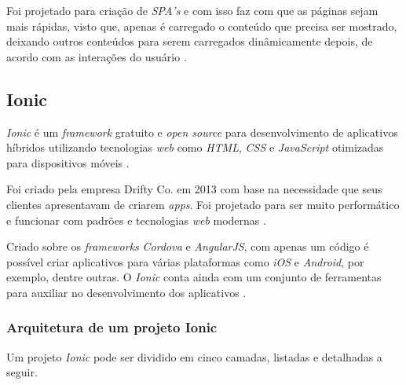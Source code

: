 Foi projetado para criação de \textit{SPA's} e com isso faz com que as páginas sejam mais rápidas, visto que, apenas é carregado o conteúdo que precisa ser mostrado, 
deixando outros conteúdos para serem carregados dinâmicamente depois, de acordo com as interações do usuário \cite{rodriguez_diseno_2015}.

\subsection{Ionic} \label{subsection:ionic}
\textit{Ionic} é um \textit{framework} gratuito e \textit{open source} para desenvolvimento de aplicativos híbridos utilizando tecnologias 
\textit{web} como \textit{HTML}, \textit{CSS} e \textit{JavaScript} otimizadas para dispositivos móveis \cite{drifty_ionic:_2016}. 

Foi criado pela empresa Drifty Co. em 2013 com base na necessidade que seus clientes apresentavam de criarem \textit{apps}. 
Foi projetado para ser muito performático e funcionar com padrões e tecnologias \textit{web} modernas \cite{drifty_about_2016}.

Criado sobre os \textit{frameworks} \textit{Cordova} e \textit{AngularJS}, com apenas um código é possível criar aplicativos para várias 
plataformas como \textit{iOS} e \textit{Android}, por exemplo, dentre outras. O \textit{Ionic} conta ainda com um conjunto de ferramentas para auxiliar 
no desenvolvimento dos aplicativos \cite{drifty_ionic:_2016}.

\subsubsection{Arquitetura de um projeto Ionic} \label{subsubsection:arc-ionic}

Um projeto \textit{Ionic} pode ser dividido em cinco camadas, listadas e detalhadas a seguir.

